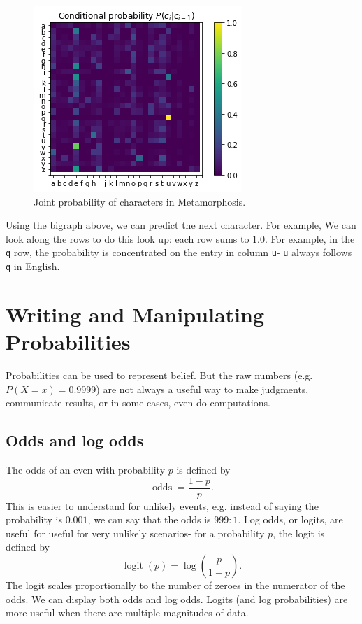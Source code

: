 \documentclass[a4paper, openany]{memoir}
\begin{document}
\begin{figure}[H]
    \centering
    \includegraphics[scale=0.6]{src/5.9 conditional probability.png}
    \caption{Joint probability of characters in Metamorphosis.}
\end{figure}
\noindent Using the bigraph above, we can predict the next character. For example, We can look along the rows to do this look up: each row sums to 1.0. For example, in the \texttt{q} row, the probability is concentrated on the entry in column \texttt{u}- \texttt{u} always follows \texttt{q} in English.

\section{Writing and Manipulating Probabilities}
Probabilities can be used to represent belief. But the raw numbers (e.g. $P(X = x) = 0.9999$) are not always a useful way to make judgments, communicate results, or in some cases, even do computations.

\subsection{Odds and log odds}
The odds of an even with probability $p$ is defined by
\[\operatorname{odds} = \frac{1 - p}{p}.\]
This is easier to understand for unlikely events, e.g. instead of saying the probability is $0.001$, we can say that the odds is $999:1$. Log odds, or logits, are useful for useful for very unlikely scenarios- for a probability $p$, the logit is defined by
\[\operatorname{logit}(p) = \log \left(\frac{p}{1-p}\right).\]
The logit scales proportionally to the number of zeroes in the numerator of the odds. We can display both odds and log odds. Logits (and log probabilities) are more useful when there are multiple magnitudes of data.
\end{document}
